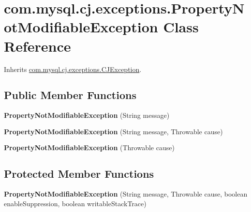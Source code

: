 \hypertarget{classcom_1_1mysql_1_1cj_1_1exceptions_1_1_property_not_modifiable_exception}{}\section{com.\+mysql.\+cj.\+exceptions.\+Property\+Not\+Modifiable\+Exception Class Reference}
\label{classcom_1_1mysql_1_1cj_1_1exceptions_1_1_property_not_modifiable_exception}


Inherits \mbox{\hyperlink{classcom_1_1mysql_1_1cj_1_1exceptions_1_1_c_j_exception}{com.\+mysql.\+cj.\+exceptions.\+C\+J\+Exception}}.

\subsection*{Public Member Functions}
\begin{DoxyCompactItemize}
\item 
\mbox{\label{classcom_1_1mysql_1_1cj_1_1exceptions_1_1_property_not_modifiable_exception_a71d799504990514657df21aad0ebcc8d}} 
{\bfseries Property\+Not\+Modifiable\+Exception} (String message)
\item 
\mbox{\label{classcom_1_1mysql_1_1cj_1_1exceptions_1_1_property_not_modifiable_exception_a453d39df061f60906350e1f68ec16acb}} 
{\bfseries Property\+Not\+Modifiable\+Exception} (String message, Throwable cause)
\item 
\mbox{\label{classcom_1_1mysql_1_1cj_1_1exceptions_1_1_property_not_modifiable_exception_a0a3164177f3fd3a8e91bd1c30b8aec30}} 
{\bfseries Property\+Not\+Modifiable\+Exception} (Throwable cause)
\end{DoxyCompactItemize}
\subsection*{Protected Member Functions}
\begin{DoxyCompactItemize}
\item 
\mbox{\label{classcom_1_1mysql_1_1cj_1_1exceptions_1_1_property_not_modifiable_exception_ae80af883e346fbe33c4eec879d50bf78}} 
{\bfseries Property\+Not\+Modifiable\+Exception} (String message, Throwable cause, boolean enable\+Suppression, boolean writable\+Stack\+Trace)
\end{DoxyCompactItemize}

